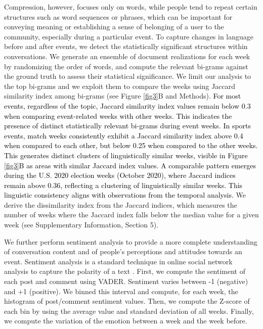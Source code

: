 \documentclass[fleqn,10pt]{wlscirep}
\newcommand{\new}[1]{\textcolor{black}{#1}}
\begin{document}
Compression, however, focuses only on words, while people tend to repeat certain structures such as word sequences or phrases, which can be important for conveying meaning or establishing a sense of belonging of a user to the community, especially during a particular event.
To capture changes in language before and after events, we detect the statistically significant structures within conversations. 
We generate an ensemble of document realizations for each week by randomizing the order of words, and compute the relevant bi-grams against the ground truth to assess their statistical significance.
We limit our analysis to the top bi-grams and we exploit them to compare the weeks using Jaccard similarity index among bi-grams (see Figure \ref{fig3}B and Methods). 
\new{
For most events, regardless of the topic, Jaccard similarity index values remain below 0.3 when comparing event-related weeks with other weeks. 
This indicates the presence of distinct statistically relevant bi-grams during event weeks.
In sports events, match weeks consistently exhibit a Jaccard similarity index above 0.4 when compared to each other, but below 0.25 when compared to the other weeks.
This generates distinct clusters of linguistically similar weeks, visible in Figure \ref{fig3}B as areas with similar Jaccard index values. 
A comparable pattern emerges during the U.S. 2020 election weeks (October 2020), where Jaccard indices remain above 0.36, reflecting a clustering of linguistically similar weeks. This linguistic consistency aligns with observations from the temporal analysis.
}
We derive the dissimilarity index from the Jaccard indices, which measures the number of weeks where the Jaccard index falls below the median value for a given week (see Supplementary Information, Section 5).

We further perform sentiment analysis to provide a more complete understanding of conversation content and of people's perceptions and attitudes towards an event. 
Sentiment analysis is a standard technique in online social network analysis to capture the polarity of a text \cite{box2021meaningful,bovet2018validation,matalon2021using}.
First, we compute the sentiment of each post and comment using VADER. Sentiment varies between -1 (negative) and +1 (positive). 
We binned this interval and compute, for each week, the histogram of post/comment sentiment values. 
Then, we compute the Z-score of each bin by using the average value and standard deviation of all weeks. 
Finally, we compute the variation of the emotion between a week and the week before.
\end{document}
